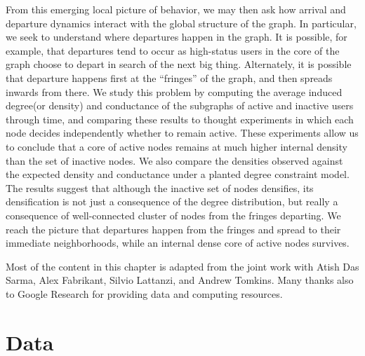 \documentclass[phd,tocprelim]{cornell}
\begin{document}
From this emerging local picture of behavior, we may then ask how
arrival and departure dynamics interact with the global structure of
the graph.  In particular, we seek to understand where departures
happen in the graph.  It is possible, for example, that departures
tend to occur as high-status users in the core of the graph choose to
depart in search of the next big thing.  Alternately, it is possible
that departure happens first at the ``fringes'' of the graph, and then
spreads inwards from there.  We study this problem by computing the
average induced degree(or density) and conductance of the subgraphs of active and inactive users
through time, and comparing these results to thought experiments in
which each node decides independently whether to remain active.  These
experiments allow us to conclude that a core of active nodes remains
at much higher internal density than the set of inactive nodes. We
also compare the densities observed against the expected density and
conductance under a planted degree constraint model.  The results
suggest that although the inactive set of nodes densifies, its densification is
not just a consequence of the degree distribution, but really a
consequence of well-connected cluster of nodes from the fringes
departing.  We reach the picture that departures happen from the
fringes and spread to their immediate neighborhoods, while
an internal dense core of active nodes survives.

Most of the content in this chapter is adapted from the joint work\cite{Wu-2013} with Atish Das Sarma, Alex Fabrikant, Silvio Lattanzi, and Andrew Tomkins. Many thanks also to Google Research for providing data and computing resources.




\section{Data}
\end{document}
